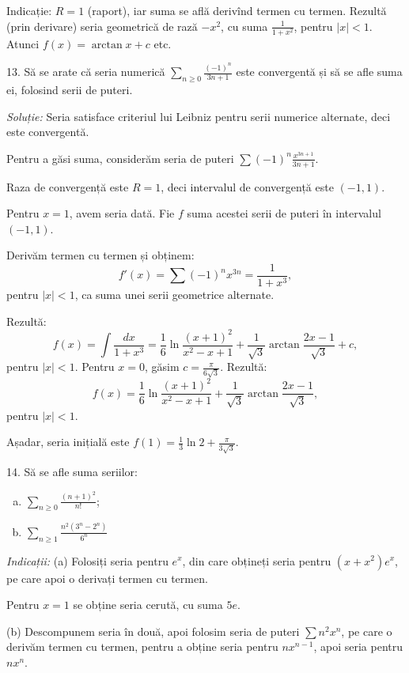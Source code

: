\documentclass[11pt,a4paper]{article}
\newcommand\ds{\displaystyle}
\theoremstyle{dotless}
\theoremstyle{dotlessdr}
\begin{document}
Indicație: $R = 1$ (raport), iar suma se află derivînd termen cu termen.
Rezultă (prin derivare) seria geometrică de rază $-x^2$, cu suma
$\frac{1}{1 + x^2}$, pentru $|x| < 1$. Atunci $f(x) = \arctan x + c$ etc.

\vspace{1cm}

13. Să se arate că seria numerică $\ds\sum_{n \geq 0} \frac{(-1)^n}{3n + 1}$ este
convergentă și să se afle suma ei, folosind serii de puteri.

\emph{Soluție:} Seria satisface criteriul lui Leibniz pentru serii numerice
alternate, deci este convergentă.

Pentru a găsi suma, considerăm seria de puteri $\sum (-1)^n \frac{x^{3n + 1}}{3n + 1}$.

Raza de convergență este $R = 1$, deci intervalul de convergență este $(-1, 1)$.

Pentru $x = 1$, avem seria dată. Fie $f$ suma acestei serii de puteri în
intervalul $(-1, 1)$.

Derivăm termen cu termen și obținem:
\[
  f'(x) = \sum (-1)^n x^{3n} = \frac{1}{1 + x^3},
\]
pentru $|x| < 1$, ca suma unei serii geometrice alternate.

Rezultă:
\[
  f(x) = \int \frac{dx}{1 + x^3} = \frac{1}{6} \ln \frac{(x + 1)^2}{x^2 - x + 1} + %
  \frac{1}{\sqrt{3}} \arctan \frac{2x - 1}{\sqrt{3}} + c,
\]
pentru $|x| < 1$. Pentru $x = 0$, găsim $c = \frac{\pi}{6 \sqrt{3}}$.
Rezultă:
\[
  f(x) = \frac{1}{6} \ln \frac{(x + 1)^2}{x^2 - x + 1} + %
  \frac{1}{\sqrt{3}} \arctan \frac{2x - 1}{\sqrt{3}},
\]
pentru $|x| < 1$.

Așadar, seria inițială este $f(1) = \frac{1}{3} \ln 2 + \frac{\pi}{3 \sqrt{3}}$.

\vspace{1cm}

14. Să se afle suma seriilor:
\begin{enumerate}[(a)]
\item $\ds\sum_{n \geq 0} \frac{(n + 1)^2}{n!}$;
\item $\ds\sum_{n \geq 1} \frac{n^2(3^n - 2^n)}{6^n}$
\end{enumerate}

\emph{Indicații:} (a) Folosiți seria pentru $e^x$, din care obțineți seria
pentru $(x + x^2)e^x$, pe care apoi o derivați termen cu termen.

Pentru $x = 1$ se obține seria cerută, cu suma $5e$.

(b) Descompunem seria în două, apoi folosim seria de puteri $\sum n^2 x^n$,
pe care o derivăm termen cu termen, pentru a obține seria pentru $nx^{n - 1}$,
apoi seria pentru $nx^n$.
\end{document}
